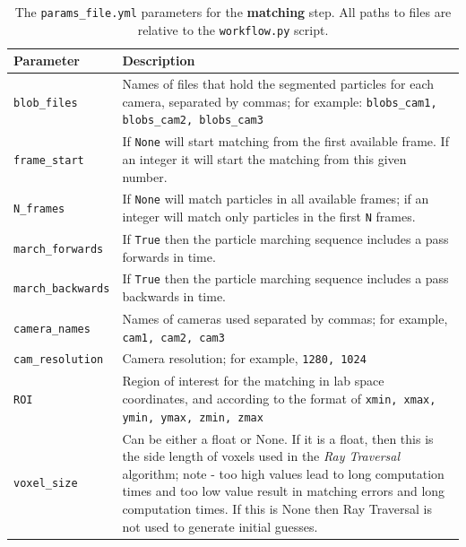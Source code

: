 \documentclass[10pt,a4paper]{article}
\begin{document}
\begin{table}[!ht]
	\centering
	\caption{The \texttt{params\_file.yml} parameters for the \textbf{matching} step. All paths to files are relative to the \texttt{workflow.py} script.}
	\label{tab:matching}
	\begin{tabular}{l m{13cm}}
		\hline
		Parameter & Description\\[.1cm]
		\hline
		
		\texttt{blob\_files} & Names of files that hold the segmented particles for each camera, separated by commas; for example: \texttt{blobs\_cam1, blobs\_cam2, blobs\_cam3} \\[.1cm]
		
		\texttt{frame\_start} & If \texttt{None} will start matching from the first available frame. If an integer it will start the matching from this given number. \\[.1cm]
		
		\texttt{N\_frames} & If \texttt{None} will match particles in all available frames; if an integer will match only particles in the first \texttt{N} frames. \\[.1cm]
		
		\texttt{march\_forwards} & If \texttt{True} then the particle marching sequence includes a pass forwards in time. \\[.1cm]
		
		\texttt{march\_backwards} & If \texttt{True} then the particle marching sequence includes a pass backwards in time. \\[.1cm]
		
		\texttt{camera\_names} & Names of cameras used separated by commas; for example, \texttt{cam1, cam2, cam3} \\[.1cm]
		
		\texttt{cam\_resolution} & Camera resolution; for example, \texttt{1280, 1024} \\[.1cm]
		
		\texttt{ROI} & Region of interest for the matching in lab space coordinates, and according to the format of \texttt{xmin, xmax, ymin, ymax, zmin, zmax} \\[.1cm]
		
		\texttt{voxel\_size} & Can be either a float or None. If it is a float, then this is the side length of voxels used in the \textit{Ray Traversal} algorithm; note - too high values lead to long computation times and too low value result in matching errors and long computation times. If this is None then Ray Traversal is not used to generate initial guesses. \\[.1cm]
		

\end{tabular}
\end{table}
\end{document}
